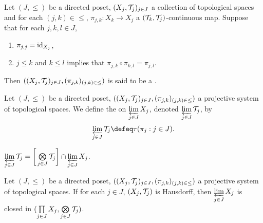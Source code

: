 \documentclass{book}
\begin{document}

\begin{defn} 
	Let $(J, {\leq})$ be a directed poset, $(X_j, \mathcal{T}_j)_{j \in J}$ a collection of topological spaces and for each $(j,k) \in {\leq}$, $\pi_{j,k}:X_k \rightarrow X_j$ a $(\mathcal{T}_k, \mathcal{T}_j)$-continuous map. Suppose that for each $j,k,l \in J$, 
	\begin{enumerate}
		\item $\pi_{j,j} = \operatorname{id}_{X_j}$,
		\item $j \leq k$ and $k \leq l$ implies that $\pi_{j,k} \circ \pi_{k,l} = \pi_{j,l}$.
	\end{enumerate}
	Then $((X_j, \mathcal{T}_j)_{j \in J}, (\pi_{j,k})_{(j,k) \in \leq})$ is said to be a .
\end{defn}

\begin{defn} 
	Let $(J, {\leq})$ be a directed poset, $((X_j, \mathcal{T}_j)_{j \in J}, (\pi_{j,k})_{(j,k) \in \leq})$ a projective system of topological spaces. We define the  on $\varprojlim\limits_{j \in J} X_j$, denoted $\varprojlim\limits_{j \in J} \mathcal{T}_j$, by $$\varprojlim\limits_{j \in J} \MT_j \defeq \tau(\pi_j: j \in J).$$
\end{defn}

\begin{ex} 
	$\varprojlim\limits_{j \in J}  \mathcal{T}_j = \bigg[ \bigotimes\limits_{j \in J} \mathcal{T}_j \bigg] \cap \varprojlim\limits_{j \in J} X_j$.
\end{ex}


\begin{ex} 
	Let $(J, {\leq})$ be a directed poset, $((X_j, \mathcal{T}_j)_{j \in J}, (\pi_{j,k})_{(j,k) \in \leq})$ a projective system of topological spaces. If for each $j \in J$, $(X_j, \mathcal{T}_j)$ is Hausdorff, then $\varprojlim\limits_{j \in J} X_j$ is closed in $(\prod\limits_{j \in J} X_j, \bigotimes\limits_{j \in J} \mathcal{T}_j)$.
\end{ex}
\end{document}
